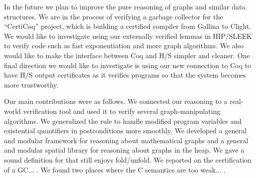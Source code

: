 In the future we plan to improve the pure reasoning of graphs and
similar data structures.  {\color{magenta}We are in the process of verifying a garbage
collector for the ``CertiCoq'' project, which is building
a certified compiler from Gallina to Clight. We would like to investigate
using our externally verified lemmas in HIP/SLEEK to verify code such as fast
exponentiation and more graph algorithms. We also would like to make
the interface between Coq and H/S simpler and cleaner.
One final direction we would like to investigate is using our new
connection to Coq to have H/S output certificates as it
verifies programs so that the system becomes more trustworthy.}

Our main contributions were as follows.  We connected our reasoning
to a real-world verification tool and used it to verify several graph-manipulating algorithms.
We generalized the 
rule to handle modified program variables and existential quantifiers in postconditions
more smoothly.  We developed a general and modular framework for reasoning
about mathematical graphs and a general and modular spatial library for
reasoning about graphs in the heap.  We gave a sound definition for 
that still enjoys fold/unfold. We reported on the certification of a GC... . We found two places where the C semantics are too weak... .
